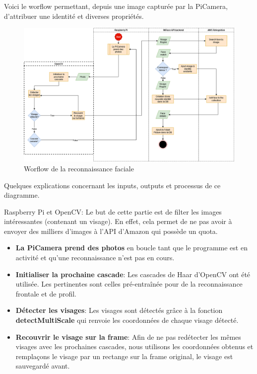 Voici le worflow permettant, depuis une image capturée par la PiCamera, d'attribuer une identité et diverses propriétés.

\clearpage
\newpage

\thispagestyle{empty}
\begin{landscape}
    \centering
\thispagestyle{empty}
\begin{figure}%
     \includegraphics[width=\linewidth]{images/facial_reco/facial_recognition_flow.png}
     \caption{Worflow de la reconnaissance faciale}
     \label{fig:worflow-reco}
\end{figure}
\end{landscape}

Quelques explications concernant les inputs, outputs et processus de ce diagramme.

Raspberry Pi et OpenCV:
Le but de cette partie est de filter les images intéressantes (contenant un visage). En effet,
cela permet de ne pas avoir à envoyer des milliers d'images à l'API d'Amazon qui possède un quota.
\begin{itemize}
    \item \textbf{La PiCamera prend des photos} en boucle tant que le programme est en activité et qu'une reconnaissance n'est pas en cours.
    \item \textbf{Initialiser la prochaine cascade}: Les cascades de Haar d'OpenCV ont été utilisée. Les pertinentes sont celles pré-entraînée pour de la reconnaissance frontale et de profil.
    \item \textbf{Détecter les visages}: Les visages sont détectés grâce à la fonction \textbf{detectMultiScale} qui renvoie les coordonnées de chaque visage détecté.
    \item \textbf{Recouvrir le visage sur la frame}: Afin de ne pas redétecter les mêmes visages avec les prochaines cascades, nous utilisons les coordonnées obtenus et remplaçons le visage par un rectange sur la frame original, le visage est sauvegardé avant.
\end{itemize}

